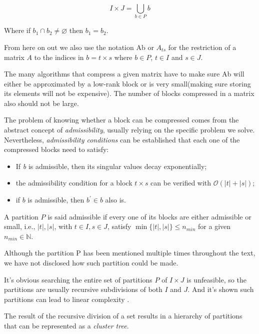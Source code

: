 \begin{equation}\label{eq:union_partition}
    I \times J = \bigcup_{b \in P} b
\end{equation}

Where if $b_{1} \cap b_{2} \neq \varnothing $ then $b_{1} = b_{2}$.

From here on out we also use the notation \gls{Ab} or $A_{ts}$ for the restriction of a matrix $A$ to the indices in $b= t \times s$ where $b \in P$, $t \in I$ and $s \in J$.

The many algorithms that compress a given matrix have to make sure \gls{Ab} will either be approximated by a low-rank block or is very small(making sure storing its elements will not be expensive). The number of blocks compressed in a matrix also should not be large.

The problem of knowing whether a block can be compressed comes from the abstract concept of \textit{admissibility}, usually relying on the specific problem we solve. Nevertheless, \textit{admissibility conditions} can be established that each one of the compressed blocks need to satisfy:

\begin{itemize}
    \item If \textit{b} is admissible, then its singular values decay exponentially;
    \item the admissibility condition for a block $t \times s$ can be verified with $\mathcal{O}(|t| + |s|)$;
    \item if $b$ is admissible, then $b^{'} \in b$ also is.
\end{itemize}

A partition $P$ is said admissible if every one of its blocks are either admissible or small, i.e., $|t|, |s|$, with $t \in I, s \in J$, satisfy $\min\{|t|,|s| \} \leq n_{min}$ for a given $n_{min} \in \mathbb{N}$.

Although the partition P has been mentioned multiple times throughout the text, we have not disclosed how such partition could be made.

It's obvious searching the entire set of partitions $P$ of $I \times J$ is unfeasible, so the partitions are usually  recursive subdivisions of both $I$ and $J$. And it's shown such partitions can lead to linear complexity \cite{bebendorf2008hierarchical}.

The result of the recursive division of a set results in a hierarchy of partitions that can be represented as a \textit{cluster tree}.

